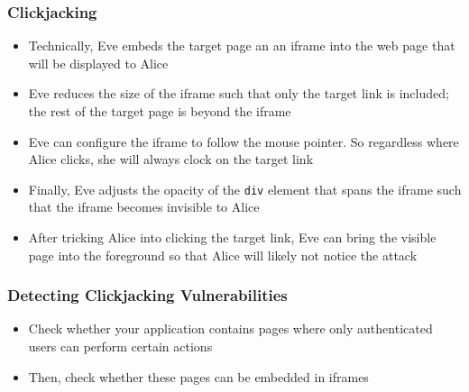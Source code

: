\begin{frame}
    \frametitle{Clickjacking}
    \begin{itemize}
        \item Technically, Eve embeds the target page an an iframe into the web page that will be displayed to Alice
        \item Eve reduces the size of the iframe such that only the target link is included; the rest of the target page is beyond the iframe
        \item Eve can configure the iframe to follow the mouse pointer. So regardless where Alice clicks, she will always clock on the target link
        \item Finally, Eve adjusts the opacity of the \texttt{div} element that spans the iframe such that the iframe becomes invisible to Alice
        \item After tricking Alice into clicking the target link, Eve can bring the visible page into the foreground so that Alice will likely not notice the attack
    \end{itemize}
\end{frame}

\begin{frame}
    \frametitle{Detecting Clickjacking Vulnerabilities}
    \begin{itemize}
        \item Check whether your application contains pages where only authenticated users can perform certain actions
        \item Then, check whether these pages can be embedded in iframes
    \end{itemize}
\end{frame}

